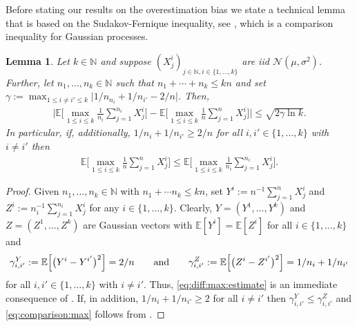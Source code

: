\documentclass{article}
\newcommand{\E}{\mathbb{E}}
\theoremstyle{plain}
\newtheorem{lemma}[theorem]{Lemma}
\theoremstyle{definition}
\theoremstyle{remark}
\begin{document}
Before stating our results on the overestimation bias we state a technical lemma that is based on the Sudakov-Fernique inequality, see \cite{Sudakov_1971, Sudakov_1976, Fernique_1975}, which is a comparison inequality for Gaussian processes.

\begin{lemma}\label{lemma:martin}
    Let $k \in \mathbb{N}$ and suppose $(X_j^i)_{j \in \mathbb{N}, i \in \{1, \ldots, k\}}$ are iid $\mathcal N(\mu,\sigma^2)$. Further, let $n_{1}, \ldots, n_{k} \in \mathbb{N}$ such that $n_{1} + \cdots + n_{k} \leq k n$ and set $\gamma := \max_{1 \leq i \ne i' \leq k} \bigl|1/n_{n_i} + 1/n_{i'} - 2/n \bigr|$. Then,
    \begin{align}
        \label{eq:diff:max:estimate}
        \Biggl|
            \E\biggl[
                \max_{1 \leq i \leq k} \frac{1}{n_{i}} \sum_{j=1}^{n_{i}} X^i_j
            \biggr]
            -
            \E\biggl[
                \max_{1 \leq i \leq k} \frac{1}{n}\sum_{j=1}^{n} X^i_j
            \biggr]
        \Biggr|
        \leq 
        \sqrt{2 \gamma \ln k}.
    \end{align}
    In particular, if, additionally, $1/n_{i} + 1/n_{i'} \geq 2/n$ for all $i, i' \in \{1, \ldots, k\}$ with $i \ne i'$ then
    \begin{align}
        \label{eq:comparison:max}
        \E\biggl[
            \max_{1 \leq i \leq k} \frac{1}{n}\sum_{j=1}^{n} X^i_j
        \biggr]
        \leq 
        \E\biggl[
            \max_{1 \leq i \leq k} \frac{1}{n_{i}}\sum_{j=1}^{n_{i}} X^{i}_{j}
        \biggr].
    \end{align}
\end{lemma}
%
\begin{proof}
    Given $n_{1}, \ldots, n_{k} \in \mathbb{N}$ with $n_{1} + \cdots n_{k} \leq k n$, set $Y^{i} := n^{-1} \sum_{j=1}^{n} X_{j}^{i}$ and $Z^{i} := n_{i}^{-1} \sum_{j=1}^{n_{i}} X_{j}^{i}$ for any $i \in \{1, \ldots, k\}$. Clearly, $Y = (Y^{1}, \ldots, Y^{k})$ and $Z = (Z^{1}, \ldots, Z^{k})$ are Gaussian vectors with $\E[Y^{i}] = \E[Z^{i}]$ for all $i \in \{1, \ldots, k\}$ and
    \begin{align*}
        \gamma_{i, i'}^{Y}
        :=
        \E\Bigl[\bigl(Y^{i} - Y^{i'}\bigr)^2 \Bigr]
        =
        2/n
        \qquad \text{and} \qquad
        \gamma_{i, i'}^{Z}
        :=
        \E\Bigl[\bigl(Z^{i} - Z^{i'}\bigr)^2 \Bigr]
        =
        1/n_{i} + 1/n_{i'}
    \end{align*}
    for all $i, i' \in \{1, \ldots, k\} $ with $i \ne i'$. Thus, \eqref{eq:diff:max:estimate} is an immediate consequence of \citealp[Theorem~2.2.5, Eq.~(2.2.11)]{Adler_2007}. If, in addition, $1/n_{i} + 1/n_{i'} \geq 2$ for all $i \ne i'$ then $\gamma_{i, i'}^{Y} \leq \gamma_{i, i'}^{Z}$ and \eqref{eq:comparison:max} follows from \citealp[Theorem~2.2.5, Eq.~(2.2.12)]{Adler_2007}.
\end{proof}
\end{document}
